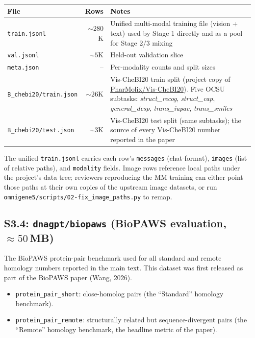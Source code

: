 \documentclass[11pt]{article}
\begin{document}
\begin{table}[H]
\centering
\small
\begin{tabular}{lrl}
\toprule
\textbf{File} & \textbf{Rows} & \textbf{Notes} \\
\midrule
\texttt{train.jsonl}            & $\sim 280$K & Unified multi-modal training file (vision + text) used by Stage 1 directly and as a pool for Stage 2/3 mixing \\
\texttt{val.jsonl}              & $\sim 5$K   & Held-out validation slice \\
\texttt{meta.json}              & --          & Per-modality counts and split sizes \\
\texttt{B\_chebi20/train.json}  & $\sim 26$K  & Vis-CheBI20 train split (project copy of \href{https://huggingface.co/datasets/PharMolix/Vis-CheBI20}{PharMolix/Vis-CheBI20}). Five OCSU subtasks: \textit{struct\_recog}, \textit{struct\_cap}, \textit{general\_desp}, \textit{trans\_iupac}, \textit{trans\_smiles} \\
\texttt{B\_chebi20/test.json}   & $\sim 3$K   & Vis-CheBI20 test split (same subtasks); the source of every Vis-CheBI20 number reported in the paper \\
\bottomrule
\end{tabular}
\end{table}

The unified \texttt{train.jsonl} carries each row's \texttt{messages}
(chat-format), \texttt{images} (list of relative paths), and \texttt{modality}
fields. Image rows reference local paths under the project's data tree;
reviewers reproducing the MM training can either point those paths at their
own copies of the upstream image datasets, or run
\texttt{omnigene5/scripts/02-fix\_image\_paths.py} to remap.

\subsection*{S3.4: \texttt{dnagpt/biopaws} (BioPAWS evaluation, $\approx 50$\,MB)}

The BioPAWS protein-pair benchmark used for all standard and remote homology
numbers reported in the main text. This dataset was first released as part of
the BioPAWS paper (Wang, 2026).

\begin{itemize}
\setlength{\itemsep}{2pt}
\item \texttt{protein\_pair\_short}: close-homolog pairs (the ``Standard'' homology benchmark).
\item \texttt{protein\_pair\_remote}: structurally related but sequence-divergent pairs (the ``Remote'' homology benchmark, the headline metric of the paper).
\end{itemize}
\end{document}
